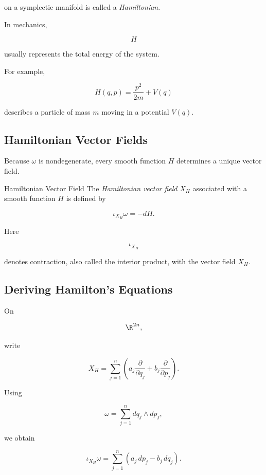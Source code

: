 on a symplectic manifold is called a \emph{Hamiltonian}.

In mechanics,

\[
H
\]

usually represents the total energy of the system.

For example,

\[
\boxed{
H(q,p)
=
\frac{p^2}{2m}
+
V(q)
}
\]

describes a particle of mass \(m\) moving in a potential \(V(q)\).

\subsection{Hamiltonian Vector Fields}
\label{subsec:hamiltonian-vector-fields}

Because \(\omega\) is nondegenerate, every smooth function \(H\) determines
a unique vector field.

\begin{definitionbox}{Hamiltonian Vector Field}
The \emph{Hamiltonian vector field} \(X_H\) associated with a smooth
function \(H\) is defined by

\[
\boxed{
\iota_{X_H}\omega=-dH.
}
\]
\end{definitionbox}

Here

\[
\iota_{X_H}
\]

denotes contraction, also called the interior product, with the vector field
\(X_H\).

\subsection{Deriving Hamilton's Equations}
\label{subsec:deriving-hamilton-equations}

On

\[
\R^{2n},
\]

write

\[
X_H
=
\sum_{j=1}^{n}
\left(
a_j\frac{\partial}{\partial q_j}
+
b_j\frac{\partial}{\partial p_j}
\right).
\]

Using

\[
\omega
=
\sum_{j=1}^{n}
dq_j\wedge dp_j,
\]

we obtain

\[
\iota_{X_H}\omega
=
\sum_{j=1}^{n}
\left(
a_j\,dp_j-b_j\,dq_j
\right).
\]

